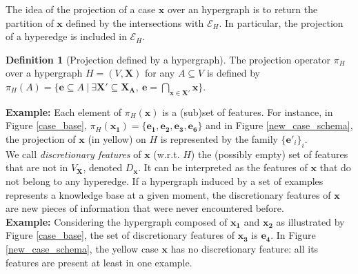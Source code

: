 \documentclass[preprint,12pt]{elsarticle}
\theoremstyle{definition}
\newtheorem{definition}{Definition}[section]
\begin{document}
The idea of the projection of a case $\mathbf x$ over an hypergraph is to return the partition of $\mathbf x$ defined by the intersections with $\mathcal{E}_H$. In particular, the projection of a hyperedge is included in $\mathcal{E}_H$.
\begin{definition}[Projection defined by a hypergraph]
The projection operator $\pi_H$ over a hypergraph $H = (V, \mathbf{X})$ for any $A \subseteq V$ is defined by $\pi_H(A) = \{ \mathbf{e} \subseteq A ~ | ~ \exists \mathbf{X'} \subseteq \mathbf{X_A}, ~ \mathbf{e} = \underset{\mathbf{x} \in \mathbf{X'}}{\bigcap} \mathbf{x} \}$.
\end{definition}

\noindent
{\bf Example:} Each element of $\pi_H(\mathbf{x})$ is a (sub)set of features. For instance, in Figure \ref{case_base}, $\pi_H(\mathbf{x_1}) = \{ \mathbf{e_1}, \mathbf{e_2}, \mathbf{e_3}, \mathbf{e_6} \}$ and in Figure \ref{new_case_schema}, the projection of $\mathbf{x}$ (in yellow) on $H$ is represented by the family $\{ \mathbf{e'}_i \}_i$. \\

We call {\it discretionary features} of $\mathbf{x}$ (w.r.t. $H$) the (possibly empty) set of features that are not in $V_{\mathbf{X}}$, denoted $D_\mathbf{x}$. It can be interpreted as the features of $\mathbf{x}$ that do not belong to any hyperedge. If a hypergraph induced by a set of examples represents a knowledge base at a given moment, the discretionary features of $\mathbf x$ are new pieces of information that were never encountered before. \\

\noindent
{\bf Example:} Considering the hypergraph composed of $\mathbf{x_1}$ and $\mathbf{x_2}$ as illustrated by Figure \ref{case_base}, the set of discretionary features of $\mathbf{x_3}$ is $\mathbf{e_4}$. In Figure \ref{new_case_schema}, the yellow case $\mathbf{x}$ has no discretionary feature: all its features are present at least in one example.\\
\end{document}
